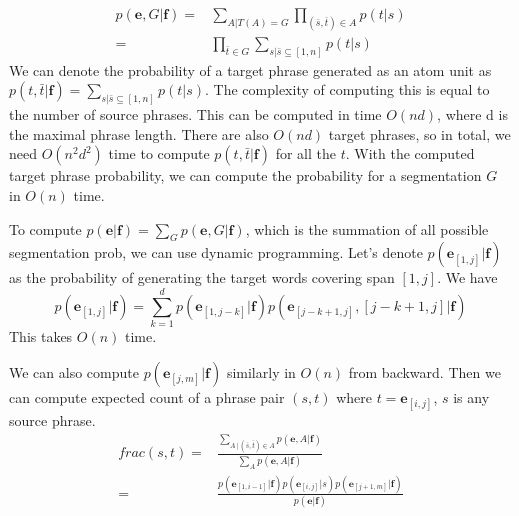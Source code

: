 \documentclass[11pt, letterpaper]{article}   	%
\begin{document}
\begin{itemize}
\begin{align}
p(\textbf{e},G | \textbf{f})=&\sum_{A|T(A)=G} \prod_{(\bar{s},\bar{t})\in A} p(t|s)\\
=& \prod_{\bar{t}\in G} \sum_{s|\bar{s} \subseteq [1,n]} p(t|s)
\end{align}
We can denote the probability of a target phrase generated as an atom unit as $p(t,\bar{t}|\textbf{f})=\sum_{s|\bar{s} \subseteq [1,n]}p(t|s)$. The complexity of computing this is equal to the number of source phrases. This can be computed in time $O(nd)$, where d is the maximal phrase length. There are also $O(nd)$ target phrases, so in total, we need $O(n^2d^2)$ time to compute $p(t,\bar{t}|\textbf{f})$ for all the $t$. With the computed target phrase probability, we can compute the probability for a segmentation $G$ in $O(n)$ time.

To compute $p(\textbf{e}|\textbf{f})=\sum_{G}p(\textbf{e},G | \textbf{f})$, which is the summation of all possible segmentation prob, we can use dynamic programming. Let's denote $p(\textbf{e}_{[1,j]}|\textbf{f})$ as the probability of generating the target words covering span $[1,j]$. We have
\begin{equation}
p(\textbf{e}_{[1,j]}|\textbf{f})=\sum \limits_{k=1}^d p(\textbf{e}_{[1,j-k]}|\textbf{f})p(\textbf{e}_{[j-k+1,j]},[j-k+1,j]|\textbf{f})
\end{equation}
This takes $O(n)$ time.

We can also compute $p(\textbf{e}_{[j,m]}|\textbf{f})$ similarly in $O(n)$  from backward.
Then we can compute expected count of a phrase pair $(s,t)$ where $t=\textbf{e}_{[i,j]}$, $s$ is any source phrase.
\begin{align}
frac(s,t)=&\frac{\sum_{A \, | \,(\bar{s},\bar{t})\in A} p(\textbf{e},A|\textbf{f})}{\sum_{A} p(\textbf{e},A|\textbf{f})}\\
=& \frac{p(\textbf{e}_{[1,i-1]}|\textbf{f})p(\textbf{e}_{[i,j]}|s)p(\textbf{e}_{[j+1,m]}|\textbf{f}) }    {p(\textbf{e}|\textbf{f})}
\end{align}


\end{itemize}
\end{document}

